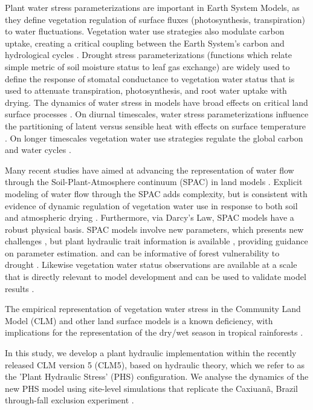 \documentclass[draft,linenumbers]{agujournal}
\begin{document}
Plant water stress parameterizations are important in Earth System Models, as they define vegetation regulation of surface fluxes (photosynthesis, transpiration) to water fluctuations.
Vegetation water use strategies also modulate carbon uptake, creating a critical coupling between the Earth System's carbon and hydrological cycles \citep{green2017}.
Drought stress parameterizations (functions which relate simple metric of soil moisture status to leaf gas exchange) are widely used to define the response of stomatal conductance to vegetation water status that is used to attenuate transpiration, photosynthesis, and root water uptake with drying.
The dynamics of water stress in models have broad effects on critical land surface processes \citep{joetzjer2014}.
On diurnal timescales, water stress parameterizations influence the partitioning of latent versus sensible heat with effects on surface temperature \citep{bonan2014}.
On longer timescales vegetation water use strategies regulate the global carbon and water cycles \citep{dekauwe2015}.

Many recent studies have aimed at advancing the representation of water flow through the Soil-Plant-Atmosphere continuum (SPAC) in land models \citep{xu2016,christoffersen2016,sperry2017}.
Explicit modeling of water flow through the SPAC adds complexity, but is consistent with evidence of dynamic regulation of vegetation water use in response to both soil and atmospheric drying \citep{sperry2015}.
Furthermore, via Darcy's Law, SPAC models have a robust physical basis.
SPAC models involve new parameters, which presents new challenges \citep{drake2017}, but plant hydraulic trait information is available \citep{kattge2011,anderegg2015a}, providing guidance on parameter estimation.   and can be informative of forest vulnerability to drought \citep{choat2012}.
Likewise vegetation water status observations are available at a scale that is directly relevant to model development \citep{konings2016,grant2016} and can be used to validate model results \citep{momen2017,konings2017b}.

The empirical representation of vegetation water stress in the Community Land Model (CLM) and other land surface models is a known deficiency, with implications for the representation of the dry/wet season in tropical rainforests \citep{powell2013,ukkola2016}.

In this study, we develop a  plant hydraulic implementation within the recently released CLM version 5 (CLM5), based on hydraulic theory, which we refer to as the 'Plant Hydraulic Stress' (PHS) configuration. We analyse the dynamics of the new PHS model  using site-level simulations that replicate the Caxiuan\~a, Brazil through-fall exclusion experiment \citep{fisher2006}.
\end{document}
